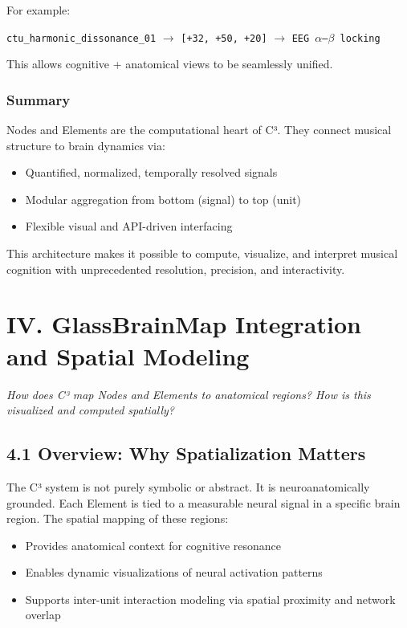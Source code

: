 For example:

\texttt{ctu\_harmonic\_dissonance\_01} $\rightarrow$ \texttt{[+32, +50, +20]} $\rightarrow$ \texttt{EEG $\alpha$–$\beta$ locking}

This allows cognitive + anatomical views to be seamlessly unified.

\subsubsection*{Summary}

Nodes and Elements are the computational heart of C³. They connect musical structure to brain dynamics via:

\begin{itemize}
    \item Quantified, normalized, temporally resolved signals
    \item Modular aggregation from bottom (signal) to top (unit)
    \item Flexible visual and API-driven interfacing
\end{itemize}

This architecture makes it possible to compute, visualize, and interpret musical cognition with unprecedented resolution, precision, and interactivity.

\section*{IV. GlassBrainMap Integration and Spatial Modeling}

\textit{How does C³ map Nodes and Elements to anatomical regions? How is this visualized and computed spatially?}

\subsection*{4.1 Overview: Why Spatialization Matters}

The C³ system is not purely symbolic or abstract. It is neuroanatomically grounded. Each Element is tied to a measurable neural signal in a specific brain region. The spatial mapping of these regions:

\begin{itemize}
    \item Provides anatomical context for cognitive resonance
    \item Enables dynamic visualizations of neural activation patterns
    \item Supports inter-unit interaction modeling via spatial proximity and network overlap
\end{itemize}

